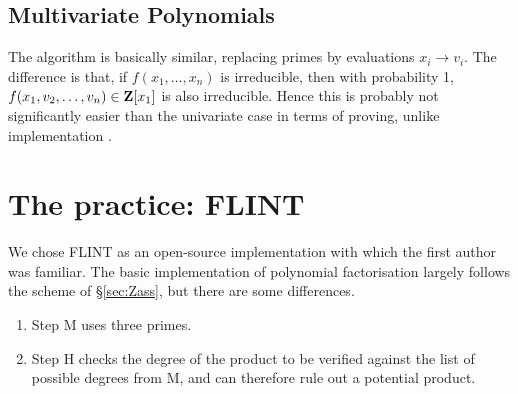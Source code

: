 \documentclass{llncs}
\begin{document}
\subsection{Multivariate Polynomials}
The algorithm is basically similar, replacing primes by evaluations $x_i\rightarrow v_i$.  The difference is that, if $f(x_1,\ldots,x_n)$ is irreducible, then with probability 1, $f(x_1,v_2,\ldots,v_n)\in{\bf Z}[x_1]$ is also irreducible. Hence this is probably not significantly easier than the univariate case in terms of proving, unlike implementation \cite{MooreNorman1981}.
\section{The practice: FLINT}
We chose FLINT \cite{Flint2023a} as an open-source implementation with which the first author was familiar. The basic implementation of polynomial factorisation largely follows the scheme of \S\ref{sec:Zass}, but there are some differences.
\begin{enumerate}
\item Step M uses three primes.
\item Step H checks the degree of the product to be verified against the list of possible degrees from M, and can therefore rule out a potential product.
\end{enumerate}
\end{document}
